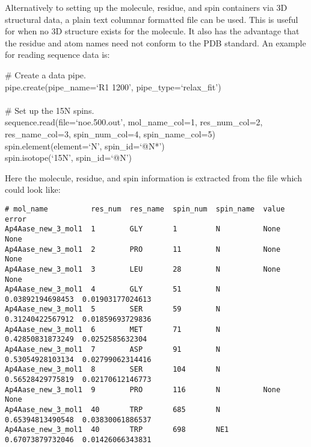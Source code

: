 Alternatively to setting up the molecule, residue, and spin containers via 3D structural data, a plain text columnar formatted file can be used.  This is useful for when no 3D structure exists for the molecule.  It also has the advantage that the residue and atom names need not conform to the PDB standard.  An example for reading sequence data is:

\begin{exampleenv}
\# Create a data pipe. \\
pipe.create(pipe\_name=`R1 1200', pipe\_type=`relax\_fit') \\
 \\
\# Set up the 15N spins. \\
sequence.read(file=`noe.500.out', mol\_name\_col=1, res\_num\_col=2, res\_name\_col=3, spin\_num\_col=4, spin\_name\_col=5) \\
spin.element(element=`N', spin\_id=`@N*') \\
spin.isotope(`15N', spin\_id=`@N')
\end{exampleenv}

Here the molecule, residue, and spin information is extracted from the  file which could look like:

{\scriptsize \begin{verbatim}
# mol_name          res_num  res_name  spin_num  spin_name  value             error               
Ap4Aase_new_3_mol1  1        GLY       1         N          None              None                
Ap4Aase_new_3_mol1  2        PRO       11        N          None              None                
Ap4Aase_new_3_mol1  3        LEU       28        N          None              None                
Ap4Aase_new_3_mol1  4        GLY       51        N          0.03892194698453  0.01903177024613    
Ap4Aase_new_3_mol1  5        SER       59        N          0.31240422567912  0.01859693729836    
Ap4Aase_new_3_mol1  6        MET       71        N          0.42850831873249  0.0252585632304     
Ap4Aase_new_3_mol1  7        ASP       91        N          0.53054928103134  0.02799062314416    
Ap4Aase_new_3_mol1  8        SER       104       N          0.56528429775819  0.02170612146773    
Ap4Aase_new_3_mol1  9        PRO       116       N          None              None                
Ap4Aase_new_3_mol1  40       TRP       685       N          0.65394813490548  0.03830061886537    
Ap4Aase_new_3_mol1  40       TRP       698       NE1        0.67073879732046  0.01426066343831    
\end{verbatim}} \label{verb: noe.500.out}

